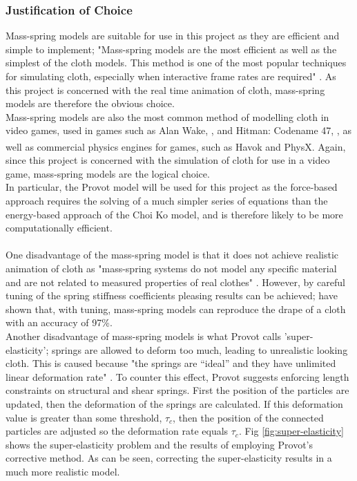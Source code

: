 \subsubsection{Justification of Choice}
Mass-spring models are suitable for use in this project as they are efficient and simple to implement; "Mass-spring models are the most efficient as well as the simplest of the cloth models.  This method is one of the most popular techniques for simulating cloth, especially when interactive frame rates are required" \parencite[2]{Zink2007}. As this project is concerned with the real time animation of cloth, mass-spring models are therefore the obvious choice.
\\Mass-spring models are also the most common method of modelling cloth in video games, used in games such as Alan Wake, \parencite[2]{Enqvist2010}, and Hitman: Codename 47, \parencite[1]{Jakobsen2005}, as well as commercial physics engines for games, such as Havok\textsuperscript{\textregistered} and PhysX\textsuperscript{\textregistered}. Again, since this project is concerned with the simulation of cloth for use in a video game, mass-spring models are the logical choice.
\\In particular, the Provot model will be used for this project as the force-based approach requires the solving of a much simpler series of equations than the energy-based approach of the Choi Ko model, and is therefore likely to be more computationally efficient.
\\\\One disadvantage of the mass-spring model is that it does not achieve realistic animation of cloth as "mass-spring systems do not model any specific material and are not related to measured properties of real clothes" \parencite[3]{Wacker2005a}. However, by careful tuning of the spring stiffness coefficients pleasing results can be achieved; \textcite{Mongus2012} have shown that, with tuning, mass-spring models can reproduce the drape of a cloth with an accuracy of 97\%.
\\Another disadvantage of mass-spring models is what Provot calls 'super-elasticity'; springs are allowed to deform too much, leading to unrealistic looking cloth. This is caused because "the springs are “ideal” and they have unlimited linear deformation rate" \parencite[3]{Vassilev2001}. To counter this effect, Provot suggests enforcing length constraints on structural and shear springs. First the position of the particles are updated, then the deformation of the springs are calculated. If this deformation value is greater than some threshold, $\tau_{c}$, then the position of the connected particles are adjusted so the deformation rate equals $\tau_{c}$. Fig \ref{fig:super-elasticity} shows the super-elasticity problem and the results of employing Provot's corrective method. As can be seen, correcting the super-elasticity results in a much more realistic model.

